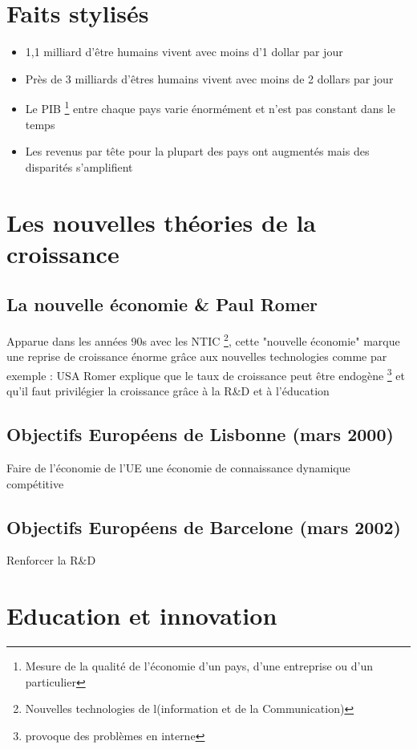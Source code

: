 \section{Faits stylisés}
\begin{itemize}
    \item 1,1 milliard d’être humains vivent avec moins d’1 dollar par jour
    \item Près de 3 milliards d’êtres humains vivent avec moins de 2  dollars par jour
    \item Le PIB \footnote{Mesure de la qualité de l'économie d'un pays, d'une entreprise ou d'un particulier} entre chaque pays varie énormément et n'est pas constant dans le temps  
    \item Les revenus par tête pour la plupart des pays ont augmentés mais des disparités s'amplifient
\end{itemize}
\newpage
\section{Les nouvelles théories de la croissance}
\subsection{La nouvelle économie \& Paul Romer}
Apparue dans les années 90s avec les NTIC \footnote{Nouvelles technologies de l(information et de la Communication)}, cette "nouvelle économie" marque une reprise de croissance énorme grâce aux nouvelles technologies comme par exemple : USA \newline
Romer explique que le taux de croissance peut être endogène \footnote{provoque des problèmes en interne} et qu'il faut privilégier la croissance grâce à la R\&D et à l'éducation
\subsection{Objectifs Européens de Lisbonne (mars 2000)}
Faire de l'économie de l'UE une économie de connaissance dynamique compétitive
\subsection{Objectifs Européens de Barcelone (mars 2002)}
Renforcer la R\&D
\section{Education et innovation}
